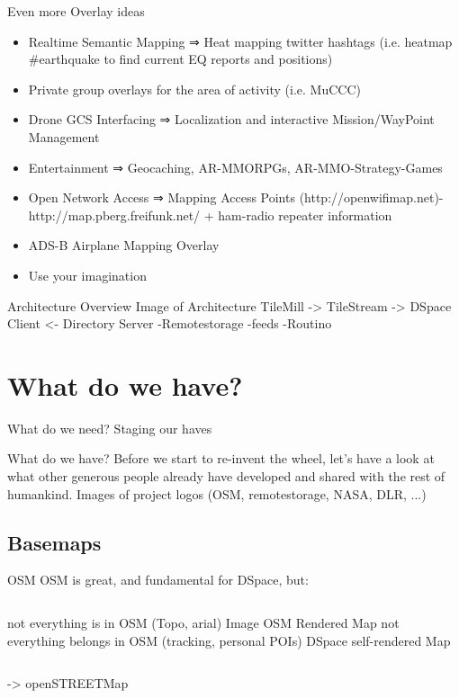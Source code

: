 \documentclass{beamer}
\begin{document}
\begin{frame}{Even more Overlay ideas}{}
 \vspace{1em}
 \begin{itemize}
  \item Realtime Semantic Mapping ⇒ Heat mapping twitter hashtags (i.e. heatmap \#earthquake to find current EQ reports and positions)
  \item Private group overlays for the area of activity (i.e. MuCCC)
  \item Drone GCS Interfacing ⇒ Localization and interactive Mission/WayPoint Management
  \item Entertainment ⇒ Geocaching, AR-MMORPGs, AR-MMO-Strategy-Games
  \item Open Network Access ⇒ Mapping Access Points (http://openwifimap.net)-http://map.pberg.freifunk.net/ + ham-radio repeater information
  \item ADS-B Airplane Mapping Overlay
  \item Use your imagination
 \end{itemize}
\end{frame}

\begin{frame}{Architecture Overview}
Image of Architecture
TileMill -> TileStream -> DSpace Client <- Directory Server
-Remotestorage
-feeds
-Routino

\end{frame}



\section{What do we have?}

\begin{frame}{What do we need?}
 Staging our haves
\end{frame}

\begin{frame}{What do we have?}
Before we start to re-invent the wheel, let's have a look at what other
generous people already have developed and shared with the rest of humankind.
\pause
Images of project logos (OSM, remotestorage, NASA, DLR, ...)
\end{frame}


\subsection{Basemaps}


\begin{frame}{OSM}
 OSM is great, and fundamental for DSpace, but:
 \begin{columns}
    not everything is in OSM (Topo, arial)
    Image OSM Rendered Map
    not everything belongs in OSM (tracking, personal POIs)
    DSpace self-rendered Map

 \end{columns}
-> openSTREETMap

\end{frame}
\end{document}
